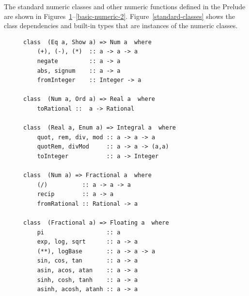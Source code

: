 The standard numeric classes and other numeric functions defined in
the Prelude are shown
in Figures~\ref{basic-numeric-1}--\ref{basic-numeric-2}.
Figure~\ref{standard-classes} shows the class dependencies and
built-in types that are instances of the numeric classes.

\begin{figure}[tb]
\begin{outlineenv}
{\small\begin{verbatim}
class  (Eq a, Show a) => Num a  where
    (+), (-), (*)  :: a -> a -> a
    negate         :: a -> a
    abs, signum    :: a -> a
    fromInteger    :: Integer -> a

class  (Num a, Ord a) => Real a  where
    toRational ::  a -> Rational

class  (Real a, Enum a) => Integral a  where
    quot, rem, div, mod :: a -> a -> a
    quotRem, divMod     :: a -> a -> (a,a)
    toInteger           :: a -> Integer

class  (Num a) => Fractional a  where
    (/)          :: a -> a -> a
    recip        :: a -> a
    fromRational :: Rational -> a

class  (Fractional a) => Floating a  where
    pi                  :: a
    exp, log, sqrt      :: a -> a
    (**), logBase       :: a -> a -> a
    sin, cos, tan       :: a -> a
    asin, acos, atan    :: a -> a
    sinh, cosh, tanh    :: a -> a
    asinh, acosh, atanh :: a -> a
\end{verbatim}}
\end{outlineenv}
\label{basic-numeric-1}
\indextt{+}
\indextt{-}
\indextt{*}
\indextt{/}
\indextt{**}
\end{figure}

